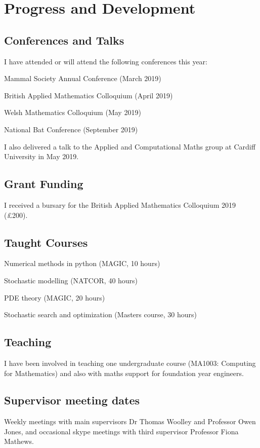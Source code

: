 \chapter{Progress and Development}

\section{Conferences and Talks}

I have attended or will attend the following conferences this year:
\begin{todolist}
  \item[\done] Mammal Society Annual Conference (March 2019)
  \item[\done] British Applied Mathematics Colloquium (April 2019)
  \item[\done] Welsh Mathematics Colloquium (May 2019)
  \item National Bat Conference (September 2019)
  \end{todolist}

I also delivered a talk to the Applied and Computational Maths group
at Cardiff University in May 2019.

\section{Grant Funding}

I received a bursary for the British Applied Mathematics Colloquium 2019 (£200).

\section{Taught Courses}

\begin{todolist}
\item[\done] Numerical methods in python (MAGIC, 10 hours)
\item[\done] Stochastic modelling (NATCOR, 40 hours)
\item[\done] PDE theory (MAGIC, 20 hours)
\item Stochastic search and optimization (Masters course, 30 hours)
\end{todolist}

\section{Teaching}

I have been involved in teaching one undergraduate course (MA1003: Computing for
Mathematics) and also with maths support for foundation year engineers.

\section{Supervisor meeting dates}
Weekly meetings with main supervisors Dr Thomas Woolley and Professor Owen Jones, and occasional skype
meetings with third supervisor Professor Fiona Mathews.
